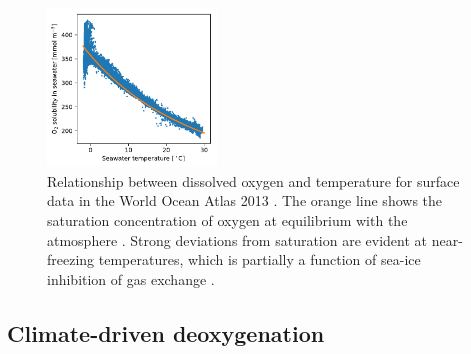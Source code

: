 \documentclass[draft,linenumbers]{report_chapter}
\begin{document}
\begin{figure}[tb]
\centering
\includegraphics[width=0.4\textwidth]{o2sol-v-temp.pdf}
\caption{Relationship between dissolved oxygen and temperature for surface data in the World Ocean Atlas 2013 \citep{Garcia-Locarnini-etal-2014}.
The orange line shows the saturation concentration of oxygen at equilibrium with the atmosphere \protect\citep{Garcia-Gordon-1992}.
Strong deviations from saturation are evident at near-freezing temperatures, which is partially a function of sea-ice inhibition of gas exchange \citep{Ito-Follows-etal-2004}.
}
\label{fig:o2-sol}
\end{figure}

\subsection{Climate-driven deoxygenation}
\end{document}
